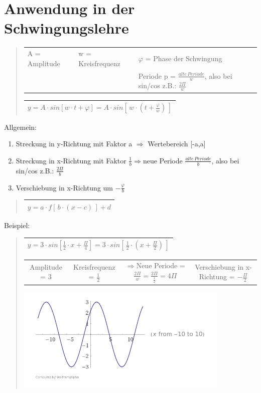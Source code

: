 \section*{Anwendung in der Schwingungslehre}
\begin{verse}
\begin{tabular}{lll}
A = Amplitude & w = Kreisfrequenz & $\varphi$ = Phase der Schwingung\tabularnewline
 &  & Periode p = $\frac{alte\, Periode}{w}$, also bei sin/cos z.B.: $\frac{2\Pi}{w}$\tabularnewline
\end{tabular}

\begin{tabular}{|c|}
\hline 
$y=A\cdot sin[w\cdot t+\varphi]=A\cdot sin[\, w\cdot(t+\frac{\varphi}{w})\,]$\tabularnewline
\hline 
\end{tabular}
\end{verse}
Allgemein:
\begin{enumerate}
\item Streckung in y-Richtung mit Faktor a $\Rightarrow$ Wertebereich {[}-a,a{]}
\item Streckung in x-Richtung mit Faktor $\frac{1}{b}\Rightarrow$neue Periode
$\frac{alte\, Periode}{b}$, also bei sin/cos z.B.: $\frac{2\Pi}{b}$
\item Verschiebung in x-Richtung um $-\frac{\varphi}{b}$\end{enumerate}
\begin{verse}
\begin{tabular}{|c|}
\hline 
$y=a\cdot f[\, b\cdot(x-c)\,]+d$\tabularnewline
\hline 
\end{tabular}
\end{verse}
Beispiel:
\begin{verse}
\begin{tabular}{|c|}
\hline 
$y=3\cdot sin[\frac{1}{2}\cdot x+\frac{\Pi}{4}]=3\cdot sin[\,\frac{1}{2}\cdot(x+\frac{\Pi}{2})\,]$\tabularnewline
\hline 
\end{tabular}

\begin{tabular}{cccc}
Amplitude = 3 & Kreisfrequenz = $\frac{1}{2}$ & $\Rightarrow$Neue Periode = $\frac{2\Pi}{w}=\frac{2\Pi}{\frac{1}{2}}=4\Pi$ & Verschiebung in x-Richtung = $-\frac{\Pi}{2}$\tabularnewline
\end{tabular}

\includegraphics[height=5cm]{Repetition/Schwingung}
\end{verse}

